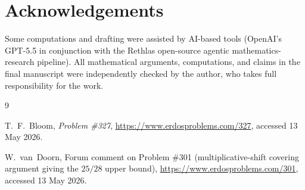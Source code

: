 \documentclass{amsart}
\begin{document}
\section*{Acknowledgements}
Some computations and drafting were assisted by AI-based tools (OpenAI's GPT-5.5 in conjunction with the Rethlas open-source agentic mathematics-research pipeline). All mathematical arguments, computations, and claims in the final manuscript were independently checked by the author, who takes full responsibility for the work.

\begin{thebibliography}{9}

T.~F.~Bloom,
\emph{\Erdos{} Problem \#327},
\url{https://www.erdosproblems.com/327},
accessed 13 May 2026.

W.~van~Doorn,
Forum comment on \Erdos{} Problem \#301
(multiplicative-shift covering argument giving the $25/28$ upper bound),
\url{https://www.erdosproblems.com/301},
accessed 13 May 2026.

\end{thebibliography}
\end{document}
